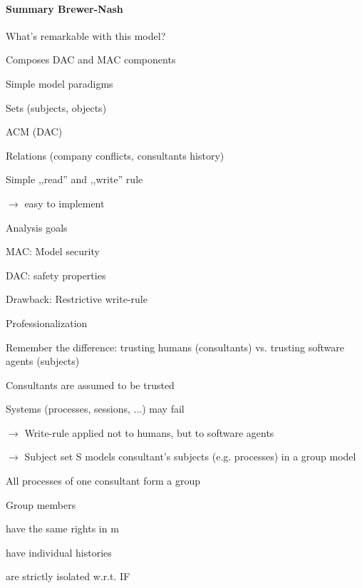 \documentclass[a4paper]{article}
\begin{document}
\begin{multicols}{3}
    \paragraph{Summary Brewer-Nash}
    What’s remarkable with this model?
    \begin{itemize*}
        \item Composes DAC and MAC components
        \item Simple model paradigms
        \begin{itemize*}
            \item Sets (subjects, objects)
            \item ACM (DAC)
            \item Relations (company conflicts, consultants history)
            \item Simple ,,read'' and ,,write'' rule
            \item[$\rightarrow$] easy to implement
        \end{itemize*}
        \item Analysis goals
        \begin{itemize*}
            \item MAC: Model security
            \item DAC: safety properties
        \end{itemize*}
        \item Drawback: Restrictive write-rule
    \end{itemize*}

    Professionalization
    \begin{itemize*}
        \item Remember the difference: trusting humans (consultants) vs. trusting software agents (subjects)
        \begin{itemize*}
            \item Consultants are assumed to be trusted
            \item Systems (processes, sessions, ...) may fail
        \end{itemize*}
        \item[$\rightarrow$] Write-rule applied not to humans, but to software agents
        \item[$\rightarrow$] Subject set S models consultant’s subjects (e.g. processes) in a group model
        \begin{itemize*}
            \item All processes of one consultant form a group
            \item Group members
            \begin{itemize*}
                \item have the same rights in m
                \item have individual histories
                \item are strictly isolated w.r.t. IF
            \end{itemize*}
        \end{itemize*}
    \end{itemize*}


\end{multicols}
\end{document}
